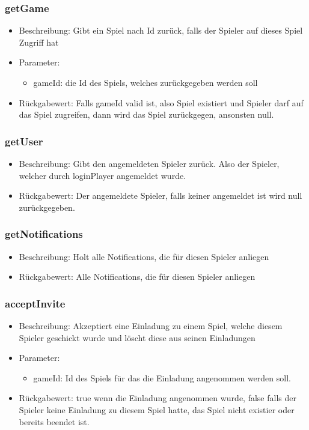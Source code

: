 \documentclass[a4paper]{scrreprt}
\begin{document}
	\subsubsection{getGame}
	\begin{itemize}
		\item Beschreibung: Gibt ein Spiel nach Id zurück, falls der Spieler auf dieses Spiel Zugriff hat
		\item Parameter:
		\begin{itemize}
			\item gameId: die Id des Spiels, welches zurückgegeben werden soll
		\end{itemize}
		\item Rückgabewert: Falls gameId valid ist, also Spiel existiert und Spieler darf auf das Spiel zugreifen, dann wird das Spiel zurückgegen, ansonsten null.
	\end{itemize}
	\subsubsection{getUser}
	\begin{itemize}
		\item Beschreibung: Gibt den angemeldeten Spieler zurück. Also der Spieler, welcher durch loginPlayer angemeldet wurde.
		\item Rückgabewert: Der angemeldete Spieler, falls keiner angemeldet ist wird null zurückgegeben.
	\end{itemize}
	
	\subsubsection{getNotifications}
	\begin{itemize}
		\item Beschreibung: Holt alle Notifications, die für diesen Spieler anliegen
		\item Rückgabewert:  Alle Notifications, die für diesen Spieler anliegen
	\end{itemize}
	\subsubsection{acceptInvite}
	\begin{itemize}
		\item Beschreibung: Akzeptiert eine Einladung zu einem Spiel, welche diesem Spieler geschickt wurde und löscht diese aus seinen Einladungen
		\item Parameter:
		\begin{itemize}
			\item gameId: Id des Spiels für das die Einladung angenommen werden soll.
		\end{itemize}
		\item Rückgabewert: true wenn die Einladung angenommen wurde, false falls der Spieler keine Einladung zu diesem Spiel hatte, das Spiel nicht existier oder bereits beendet ist.
	\end{itemize}
\end{document}
